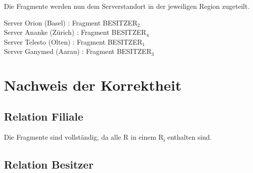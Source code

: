 \documentclass[11pt,a4paper,parskip=half]{scrartcl}
\begin{document}
Die Fragmente werden nun dem Serverstandort in der jeweiligen Region zugeteilt.

Server Orion (Basel) : Fragment BESITZER$_2$\\
Server Ananke (Zürich) : Fragment BESITZER$_4$\\
Server Telesto (Olten) : Fragment BESITZER$_1$\\
Server Ganymed (Aarau) : Fragment BESITZER$_3$


\section{Nachweis der Korrektheit}
\subsection{Relation Filiale}
Die Fragmente sind vollständig, da alle R in einem R\textsubscript{i} enthalten sind.

\subsection{Relation Besitzer}
\end{document}
